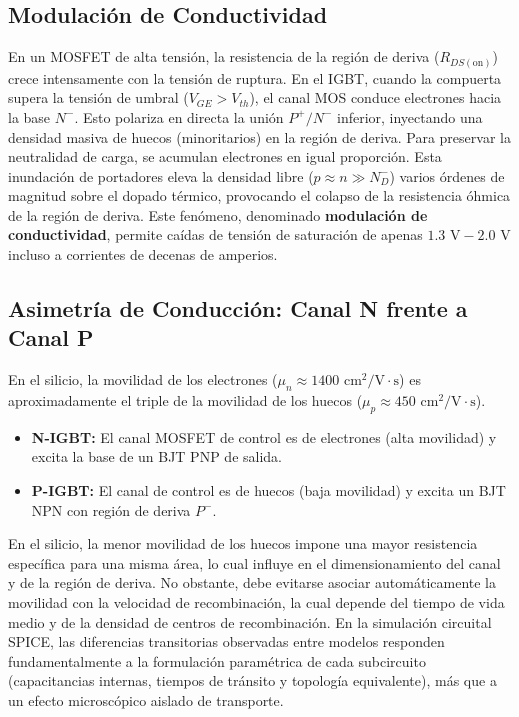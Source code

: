 \documentclass[11pt,a4paper]{article}
\begin{document}
\subsection{Modulación de Conductividad}
En un MOSFET de alta tensión, la resistencia de la región de deriva ($R_{DS(\text{on})}$) crece intensamente con la tensión de ruptura. En el IGBT, cuando la compuerta supera la tensión de umbral ($V_{GE} > V_{th}$), el canal MOS conduce electrones hacia la base $N^-$. Esto polariza en directa la unión $P^+ / N^-$ inferior, inyectando una densidad masiva de huecos (minoritarios) en la región de deriva. Para preservar la neutralidad de carga, se acumulan electrones en igual proporción. Esta inundación de portadores eleva la densidad libre ($p \approx n \gg N_D^-$) varios órdenes de magnitud sobre el dopado térmico, provocando el colapso de la resistencia óhmica de la región de deriva. Este fenómeno, denominado \textbf{modulación de conductividad}, permite caídas de tensión de saturación de apenas $1.3\text{ V} - 2.0\text{ V}$ incluso a corrientes de decenas de amperios.

\subsection{Asimetría de Conducción: Canal N frente a Canal P}
En el silicio, la movilidad de los electrones ($\mu_n \approx 1400\text{ cm}^2/\text{V}\cdot\text{s}$) es aproximadamente el triple de la movilidad de los huecos ($\mu_p \approx 450\text{ cm}^2/\text{V}\cdot\text{s}$). 
\begin{itemize}[leftmargin=*, noitemsep, topsep=2pt]
  \item \textbf{N-IGBT:} El canal MOSFET de control es de electrones (alta movilidad) y excita la base de un BJT PNP de salida.
  \item \textbf{P-IGBT:} El canal de control es de huecos (baja movilidad) y excita un BJT NPN con región de deriva $P^-$.
\end{itemize}
En el silicio, la menor movilidad de los huecos impone una mayor resistencia específica para una misma área, lo cual influye en el dimensionamiento del canal y de la región de deriva. No obstante, debe evitarse asociar automáticamente la movilidad con la velocidad de recombinación, la cual depende del tiempo de vida medio y de la densidad de centros de recombinación. En la simulación circuital SPICE, las diferencias transitorias observadas entre modelos responden fundamentalmente a la formulación paramétrica de cada subcircuito (capacitancias internas, tiempos de tránsito y topología equivalente), más que a un efecto microscópico aislado de transporte.
\end{document}
